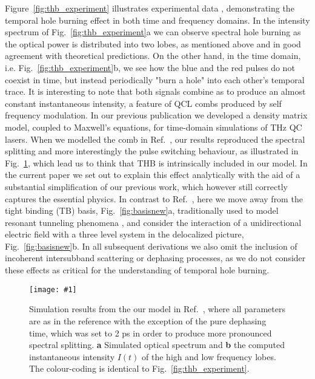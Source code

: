 \documentclass[reprint,secnumarabic,amssymb, nobibnotes, aip, prd]{revtex4-1}
\newcommand{\vspacec}{\vspace{-0.3cm}}
\newcommand{\includegraphicsXL}[1]{\texttt{[image: \#1]}}
\begin{document}
\vspacec
Figure~\ref{fig:thb_experiment} illustrates experimental data \cite{burghoff2015evaluating}, demonstrating the temporal hole burning effect in both time and frequency domains. In the intensity spectrum of Fig.~\ref{fig:thb_experiment}a we can observe spectral hole burning as the optical power is distributed into two lobes, as mentioned above and in good agreement with theoretical predictions. On the other hand, in the time domain, i.e. Fig.~\ref{fig:thb_experiment}b, we see how the blue and the red pulses do not coexist in time, but instead periodically "burn a hole" into each other's temporal trace. It is interesting to note that both signals combine as to produce an almost constant instantaneous intensity, a feature of QCL combs produced by self frequency modulation\cite{khurgin2014coherent}. In our previous publication \cite{petz2016} we developed a density matrix model, coupled to Maxwell's equations, for time-domain simulations of THz QC lasers. When we modelled the comb in Ref.~, our results reproduced the spectral splitting and more interestingly the pulse switching behaviour, as illustrated in Fig.~\ref{fig:thb_simulation}, which lead us to think that THB is intrinsically included in our model. In the current paper we set out to explain this effect analytically with the aid of a substantial simplification of our previous work, which however still correctly captures the essential physics. In contrast to Ref.~, here we move away from the tight binding (TB) basis, Fig.~\ref{fig:basisnew}a, traditionally used to model resonant tunneling phenomena \cite{callebaut2005importance}, and consider the interaction of a unidirectional electric field with a three level system in the delocalized picture, Fig.~\ref{fig:basisnew}b. In all subsequent derivations we also omit the inclusion of incoherent intersubband scattering or dephasing processes, as we do not consider these effects as critical for the understanding of temporal hole burning. 
\begin{figure}[h!]
	\begin{center}
		\includegraphicsXL{IMGS/sim_10p8_small.eps}
		\caption{Simulation results from the our model in Ref.~, where all parameters are as in the reference with the exception of the pure dephasing time, which was set to 2 ps in order to produce more pronounced spectral splitting. \textbf{a} Simulated optical spectrum and \textbf{b} the computed instantaneous intensity $I(t)$ of the high and low frequency lobes. The colour-coding is identical to Fig.~\ref{fig:thb_experiment}.}\label{fig:thb_simulation}
	\end{center}	
\end{figure}
\end{document}
